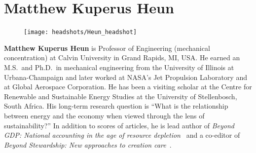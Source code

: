 \section*{Matthew Kuperus Heun}

\setlength{\intextsep}{-7pt}%
\setlength{\columnsep}{8pt}%
\begin{figure}
  \begin{center}
    \texttt{[image: headshots/Heun\_headshot]}
  \end{center}
\end{figure}
\textbf{Matthew Kuperus Heun} is Professor of Engineering 
(mechanical concentration)
at Calvin University in Grand Rapids, MI, USA.
He earned an M.S.\ and Ph.D.\ in mechanical engineering from 
the University of Illinois at Urbana-Champaign and 
later worked at NASA's Jet Propulsion Laboratory and at Global Aerospace Corporation. 
He has been a visiting scholar at the Centre for Renewable and Sustainable Energy Studies 
at the University of Stellenbosch, South Africa. 
His long-term research question is 
``What is the relationship between energy and the economy when viewed through the lens of sustainability?''
In addition to scores of articles, he is lead author of 
\emph{Beyond GDP: National accounting in the age of resource depletion}~\citep{Heun:2015aa} 
and a co-editor of
\emph{Beyond Stewardship: New approaches to creation care}~\citep{Warners:2019aa}.
